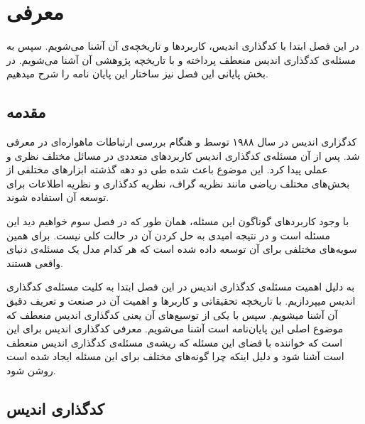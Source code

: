 \chapter{معرفی}
\label{chapter:introduction}

 در این فصل ابتدا با کدگذاری اندیس، کاربردها و تاریخچه‌ی آن آشنا می‌شویم. سپس به مسئله‌ی کدگذاری اندیس منعطف پرداخته و با تاریخچه پژوهشی آن آشنا می‌شویم. در بخش پایانی این فصل نیز ساختار این پایان نامه را شرح میدهیم.
\pagebreak

\section{مقدمه}
کدگزاری اندیس در سال ۱۹۸۸ توسط 
و
هنگام بررسی ارتباطات ماهواره‌ای در
\cite{25}
معرفی شد.  پس از آن مسئله‌ی کدگذاری اندیس کاربردهای متعددی در مسائل مختلف نظری و عملی پیدا کرد. این موضوع باعث شده طی دو دهه گذشته ابزارهای مختلفی از بخش‌های مختلف ریاضی مانند نظریه گراف، نظریه کدگذاری و نظریه اطلاعات برای توسعه آن استفاده شوند.

	با وجود کاربردهای گوناگون این مسئله، همان طور که در فصل سوم خواهیم دید این مسئله
است و در نتیجه امیدی به حل کردن آن در حالت کلی نیست. برای همین سویه‌های مختلفی برای آن توسعه داده شده است که هر کدام مدل یک مسئله‌ی دنیای واقعی هستند.

به دلیل اهمیت مسئله‌ی کدگذاری اندیس در این فصل ابتدا به کلیت مسئله‌ی کدگذاری اندیس میپردازیم. با تاریخچه تحقیقاتی و کاربرها و اهمیت آن در صنعت و تعریف دقیق آن آشنا میشویم. سپس با یکی از توسیع‌های آن یعنی کدگذاری اندیس منعطف که موضوع اصلی این پایان‌نامه است آشنا می‌شویم. معرفی کدگذاری اندیس برای این است که خواننده با فضای این مسئله‌ که ریشه‌ی مسئله‌ی کدگذاری اندیس منعطف است آشنا شود و دلیل اینکه چرا گونه‌های مختلف برای این مسئله ایجاد شده است روشن شود.
\pagebreak
\section{کدگذاری اندیس}
